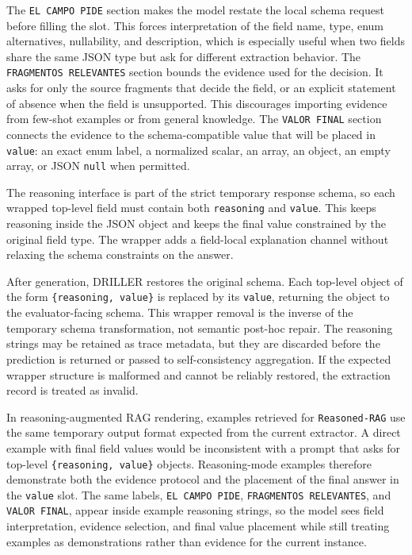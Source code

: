 The \texttt{EL CAMPO PIDE} section makes the model restate the local schema request before filling the slot. This forces interpretation of the field name, type, enum alternatives, nullability, and description, which is especially useful when two fields share the same JSON type but ask for different extraction behavior. The \texttt{FRAGMENTOS RELEVANTES} section bounds the evidence used for the decision. It asks for only the source fragments that decide the field, or an explicit statement of absence when the field is unsupported. This discourages importing evidence from few-shot examples or from general knowledge. The \texttt{VALOR FINAL} section connects the evidence to the schema-compatible value that will be placed in \texttt{value}: an exact enum label, a normalized scalar, an array, an object, an empty array, or JSON \texttt{null} when permitted.

The reasoning interface is part of the strict temporary response schema, so each wrapped top-level field must contain both \texttt{reasoning} and \texttt{value}. This keeps reasoning inside the JSON object and keeps the final value constrained by the original field type. The wrapper adds a field-local explanation channel without relaxing the schema constraints on the answer.

After generation, DRILLER restores the original schema. Each top-level object of the form \texttt{\{reasoning, value\}} is replaced by its \texttt{value}, returning the object to the evaluator-facing schema. This wrapper removal is the inverse of the temporary schema transformation, not semantic post-hoc repair. The reasoning strings may be retained as trace metadata, but they are discarded before the prediction is returned or passed to self-consistency aggregation. If the expected wrapper structure is malformed and cannot be reliably restored, the extraction record is treated as invalid.

In reasoning-augmented RAG rendering, examples retrieved for \texttt{Reasoned-RAG} use the same temporary output format expected from the current extractor. A direct example with final field values would be inconsistent with a prompt that asks for top-level \texttt{\{reasoning, value\}} objects. Reasoning-mode examples therefore demonstrate both the evidence protocol and the placement of the final answer in the \texttt{value} slot. The same labels, \texttt{EL CAMPO PIDE}, \texttt{FRAGMENTOS RELEVANTES}, and \texttt{VALOR FINAL}, appear inside example reasoning strings, so the model sees field interpretation, evidence selection, and final value placement while still treating examples as demonstrations rather than evidence for the current instance.
